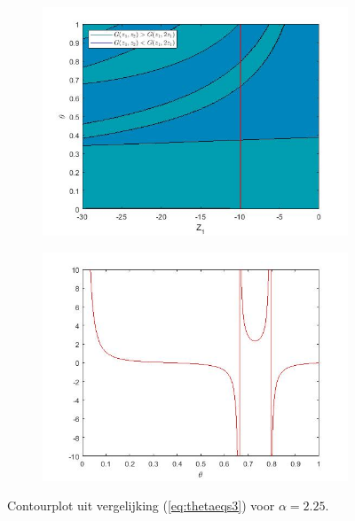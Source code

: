 \documentclass[12pt]{article}
\begin{document}
\begin{figure}[H]
    \begin{subfigure}{0.49\textwidth}
    \includegraphics[width=0.9\linewidth]{contours3alpha15.jpg} 
    \end{subfigure}
    \begin{subfigure}{0.49\textwidth}
    \includegraphics[width=0.9\linewidth]{contours3alpha15_ex.jpg}
    \end{subfigure}
    \caption{Contourplot uit vergelijking (\ref{eq:thetaeqs3}) voor \(\alpha=2.25\).}
    \label{fig:implicits3}
\end{figure}
\end{document}
